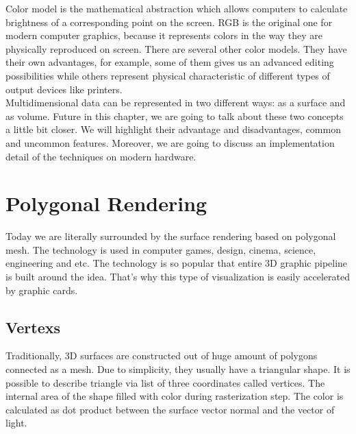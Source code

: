 \documentclass[twoside, english, 11pt]{report}
\begin{document}
Color model is the mathematical abstraction which allows computers to calculate brightness of a corresponding point on the screen. RGB is the original one for modern computer graphics, because it represents colors in the way they are physically reproduced on screen. There are several other color models. They have their own advantages, for example, some of them gives us an advanced editing possibilities while others represent physical characteristic of different types of output devices like printers.\\

Multidimensional data can be represented in two different ways: as a surface and as volume. Future in this chapter, we are going to talk about these two concepts a little bit closer. We will highlight their advantage and disadvantages, common and uncommon features. Moreover, we are going to discuss an implementation detail of the techniques on modern hardware.



\section{Polygonal Rendering}

Today we are literally surrounded by the surface rendering based on polygonal mesh. The technology is used in computer games, design, cinema, science, engineering and etc. The technology is so popular that entire 3D graphic pipeline is built around the idea. That's why this type of visualization is easily accelerated by graphic cards.\\

\subsection{Vertexs}
Traditionally, 3D surfaces are constructed out of huge amount of polygons connected as a mesh. Due to simplicity, they usually have a triangular shape. It is possible to describe triangle via list of three coordinates called vertices. The internal area of the shape filled with color during rasterization step. The color is calculated as dot product between the surface vector normal and the vector of light.
\end{document}
